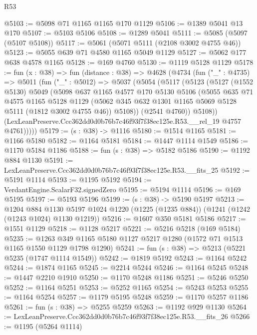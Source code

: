 \begin{lexlean}{R53}
\begin{coremodule}
@5103 := @5098 @71 @1165 @1165 @170 @1129
@5106 := @1389 @5041 @13 @170
@5107 := @5103 @5106
@5108 := @1289 @5041
@5111 := @5085 (@5097 (@5107 @5108))
@5117 := @5061 (@5071 @5111 (@2108 @3002 @4755 @46))
@5123 := @5055 @639 @71 @4580 @1165 @5049 @1129
@5127 := @5062 @177 @638 @4578 @1165
@5128 := @169 @4760
@5130 := @1119 @5128 @1129
@5178 := fun (x : @38) =>
  fun (distance : @38) =>
  @4628
    (@4734
      (fun ("_" : @4735) =>
      @5011
        (fun ("_" : @5012) =>
        @5037
          (@5054
            (@5117
              (@5123
                (@5127
                  (@1552 @5130)
                  @5049
                  (@5098
                    @637
                    @1165
                    @4577
                    @170
                    @5130
                    @5106
                    (@5055
                      @635
                      @71
                      @4575
                      @1165
                      @5128
                      @1129
                      (@5062 @345 @632 @1301 @1165 @5069 @5128 @5111 (@1812 @3002 @4755 @46))
                      @5108))
                  (@2541 @4760))
                @5108))
            (LexLeanPreserve.Ccc362dd0d0b76b7c46f93f7f38ec125e.R53.__rel_19 @4757 @4761)))))
@5179 := (s : @38) -> @1116
@5180 := @1514 @1165
@5181 := @1166 @5180
@5182 := @1164 @5181
@5184 := @1447 @1114 @1549
@5186 := @1170 @5184 @1186
@5188 := fun (s : @38) => @5182 @5186
@5190 := @1192 @884 @1130
@5191 := LexLeanPreserve.Ccc362dd0d0b76b7c46f93f7f38ec125e.R53.__fits_25
@5192 := @5191 @1114
@5193 := @1195 @5192
@5194 := VerdantEngine.ScalarF32.signedZero
@5195 := @5194 @1114
@5196 := @169 @5195
@5197 := @5193 @5196
@5199 := (s : @38) -> @5190 @5197
@5213 := @1204
    @884
    @1130
    @5197
    @1024
    @1220
    (@1225 (@1235 @884))
    (@1241 (@1242 (@1243 @1024) @1130 @1219))
@5216 := @1607 @350 @5181 @5186
@5217 := @1551 @1129
@5218 := @1128 @5217
@5221 := @5216 @5218 (@169 @5184)
@5235 := @1263 @349 @1165 @5180 @1127 @5217 @1280 (@1572 @71 @1513 @1165 @1550 @1129 @1798 @1290)
@5241 := fun (s : @38) => @5213 (@5221 @5235 (@1747 @1114 @1549))
@5242 := @1819 @5192
@5243 := @1164 @5242
@5244 := @1874 @1165
@5245 := @2214 @5244
@5246 := @1164 @5245
@5248 := @1447 @2210 @1910
@5250 := @1170 @5248 @1186
@5251 := @5246 @5250
@5252 := @1164 @5251
@5253 := @5252 @1165
@5254 := @5243 @5253
@5255 := @1164 @5254
@5257 := @1179 @5195 @5248
@5259 := @1170 @5257 @1186
@5261 := fun (s : @38) => @5255 @5259
@5263 := @1192 @929 @1130
@5264 := LexLeanPreserve.Ccc362dd0d0b76b7c46f93f7f38ec125e.R53.__fits_26
@5266 := @1195 (@5264 @1114)

\end{coremodule}
\end{lexlean}
